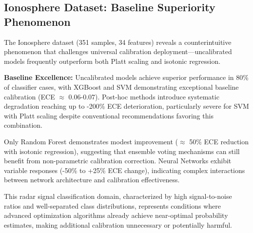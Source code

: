\documentclass[12pt, a4paper]{article}
\begin{document}
\subsection{Ionosphere Dataset: Baseline Superiority Phenomenon}\label{sec:IonosphereResults}

The Ionosphere dataset (351 samples, 34 features) reveals a counterintuitive phenomenon that challenges universal calibration deployment—uncalibrated models frequently outperform both Platt scaling and isotonic regression.

\textbf{Baseline Excellence:} Uncalibrated models achieve superior performance in 80\% of classifier cases, with XGBoost and SVM demonstrating exceptional baseline calibration (ECE $\approx$ 0.06-0.07). Post-hoc methods introduce systematic degradation reaching up to -200\% ECE deterioration, particularly severe for SVM with Platt scaling despite conventional recommendations favoring this combination.

Only Random Forest demonstrates modest improvement ($\approx$ 50\% ECE reduction with isotonic regression), suggesting that ensemble voting mechanisms can still benefit from non-parametric calibration correction. Neural Networks exhibit variable responses (-50\% to +25\% ECE change), indicating complex interactions between network architecture and calibration effectiveness.

This radar signal classification domain, characterized by high signal-to-noise ratios and well-separated class distributions, represents conditions where advanced optimization algorithms already achieve near-optimal probability estimates, making additional calibration unnecessary or potentially harmful.
\end{document}
